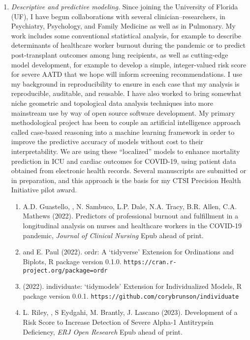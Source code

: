\documentclass{nihbiosketch}
\begin{document}
\begin{enumerate}
\item \emph{Descriptive and predictive modeling.}
Since joining the University of Florida (UF), I have begun collaborations with several clinician--researchers, in Psychiatry, Psychology, and Family Medicine as well as in Pulmonary.
My work includes some conventional statistical analysis, for example to describe determinants of healthcare worker burnout during the pandemic or to predict post-transplant outcomes among lung recipients, as well as cutting-edge model development, for example to develop a simple, integer-valued risk score for severe AATD that we hope will inform screening recommendations.
I use my background in reproducibility to ensure in each case that my analysis is reproducible, auditable, and reusable. I have also worked to bring somewhat niche geometric and topological data analysis techniques into more mainstream use by way of open source software development.
My primary methodological project has been to couple an artificial intelligence approach called case-based reasoning into a machine learning framework in order to improve the predictive accuracy of models without cost to their interpretability. We are using these ``localized'' models to enhance mortality prediction in ICU and cardiac outcomes for COVID-19, using patient data obtained from electronic health records. Several manuscripts are submitted or in preparation, and this approach is the basis for my CTSI Precision Health Initiative pilot award.

\begin{enumerate}
\item A.D. Guastello, , N. Sambuco, L.P. Dale, N.A. Tracy, B.R. Allen, C.A. Mathews (2022). Predictors of professional burnout and fulfillment in a longitudinal analysis on nurses and healthcare workers in the COVID-19 pandemic, \emph{Journal of Clinical Nursing} Epub ahead of print.
\item {} and E. Paul (2022). ordr: A `tidyverse' Extension for Ordinations and Biplots, R package version 0.1.0. \nolinkurl{https://cran.r-project.org/package=ordr}
\item {} (2022). individuate: `tidymodels' Extension for Individualized Models, R package version 0.0.1. \nolinkurl{https://github.com/corybrunson/individuate}
\item L. Riley, , S Eydgahi, M. Brantly, J. Lascano (2023). Development of a Risk Score to Increase Detection of Severe Alpha-1 Antitrypsin Deficiency, \emph{ERJ Open Research} Epub ahead of print.
\end{enumerate}


\end{enumerate}
\end{document}
